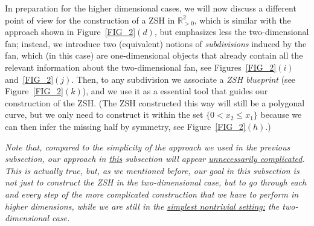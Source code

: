 \documentclass[12pt,letterpaper]{article}
\newcommand{\RRp}{\mathbb{R}_{>0}}
\begin{document}
In preparation for the higher dimensional cases, we will now discuss a different point of view for the construction of a ZSH in $\RRp^2$, which is similar with the approach shown in Figure~\ref{FIG_2}$(d)$, but emphasizes less the two-dimensional  fan; instead, we introduce two (equivalent) notions of {\em  subdivisions} induced by the fan, which (in this case) are  one-dimensional objects that already contain all the relevant information about the two-dimensional fan, see Figures~\ref{FIG_2}$(i)$ and~\ref{FIG_2}$(j)$. Then, to any subdivision we associate a {\em ZSH blueprint} (see Figure~\ref{FIG_2}$(k)$), and we use it as a essential tool that guides our construction of the ZSH. (The ZSH constructed this way  will still be a polygonal curve, but we only need to construct it within the set $\{ 0 < x_2 \le x_1 \}$ because we can then infer the missing half by symmetry, see Figure~\ref{FIG_2}$(h)$.)


\smallskip

{\em 
Note that, compared to the simplicity of the approach we used in the previous subsection, our approach in \underline{this} subsection will appear  \underline{unnecessarily complicated}. This is actually true, but, as we mentioned before, our goal in this subsection is not just to construct the  ZSH in the two-dimensional case, but to go through each and every step of the more complicated  construction that we have to perform in higher dimensions, while we are still in the \underline{simplest nontrivial setting:} the  two-dimensional case. 
}


\smallskip
\end{document}
